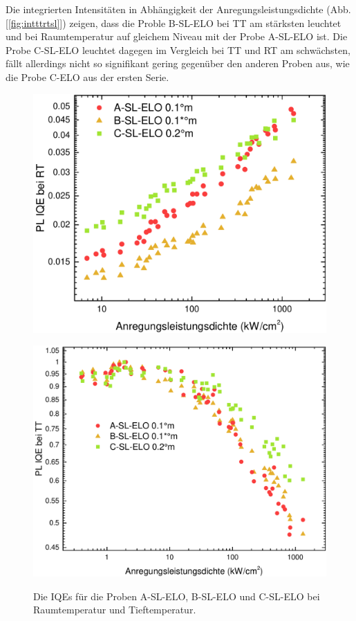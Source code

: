 \noindent 
% 
Die integrierten Intensitäten in Abhängigkeit der Anregungsleistungsdichte (Abb. [\ref{fig:intttrtsl}]) zeigen, dass die Proble B-SL-ELO bei TT am stärksten leuchtet und bei Raumtemperatur auf gleichem Niveau mit der Probe A-SL-ELO ist. Die Probe C-SL-ELO leuchtet dagegen im Vergleich bei TT und RT am schwächsten, fällt allerdings nicht so signifikant gering gegenüber den anderen Proben aus, wie die Probe C-ELO aus der ersten Serie.
%
\begin{figure}[H]
  \centering
  \begin{minipage}[t]{0.49\textwidth}
    \centering
    \includegraphics[width=\textwidth]{Bilder/TS4048/corrIQERT.pdf}
    \label{fig:eloiqeRT}
  \end{minipage}
	\hfill
  \begin{minipage}[t]{0.49\textwidth}
    \centering
    \includegraphics[width=\linewidth]{Bilder/TS4048/IQETT.pdf}
    \label{fig:slelocorriqeRT}
  \end{minipage}
	\label{fig:iqesl}
	\caption{Die IQEs für die Proben A-SL-ELO, B-SL-ELO und C-SL-ELO bei Raumtemperatur und Tieftemperatur.}
\end{figure}
